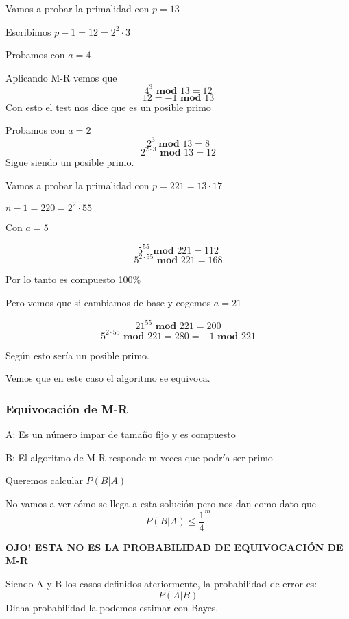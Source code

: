 \begin{example}
	Vamos a probar la primalidad con $p=13$
	
	Escribimos $p-1 = 12 = 2^2\cdot3$
	
	Probamos con $a = 4$
	
	Aplicando M-R vemos que 
	$$4^3 \textbf{ mod } 13 = 12$$
	$$12 = -1 \textbf{ mod } 13$$
	Con esto el test nos dice que es un posible primo
	
	Probamos con $a = 2$
	 $$2^3 \textbf{ mod } 13 = 8$$
	 $$2^{2 \cdot 3} \textbf{ mod } 13 = 12$$
	Sigue siendo un posible primo.
\end{example}

\begin{example}
	Vamos a probar la primalidad con $p = 221 = 13 \cdot 17$
	
	$n-1 = 220 = 2^2 \cdot 55$
	
	Con $a = 5$
	
	$$5^{55} \textbf{ mod } 221 = 112$$
	$$5^{2 \cdot 55} \textbf{ mod } 221 = 168$$
	
	Por lo tanto es compuesto 100\%
	
	Pero vemos que si cambiamos de base y cogemos $a=21$
	
	$$21^{55} \textbf{ mod } 221 = 200$$
	$$5^{2 \cdot 55} \textbf{ mod } 221 = 280 = -1 \textbf{ mod } 221$$
	
	Según esto sería un posible primo.
	
	Vemos que en este caso el algoritmo se equivoca.
\end{example}

\subsubsection{Equivocación de M-R}

A: Es un número impar de tamaño fijo y es compuesto

B: El algoritmo de M-R responde m veces que podría ser primo

Queremos calcular $P(B|A)$

No vamos a ver cómo se llega a esta solución pero nos dan como dato que
$$P(B|A) \leq \frac{1}{4}^m$$

\textbf{OJO! ESTA NO ES LA PROBABILIDAD DE EQUIVOCACIÓN DE M-R}

\begin{defn}
	Siendo A y B los casos definidos ateriormente, la probabilidad de error es:$$P(A|B)$$
	Dicha probabilidad la podemos estimar con Bayes.
\end{defn}

